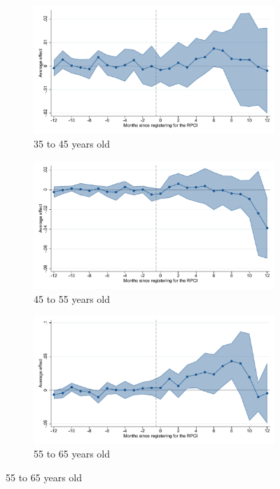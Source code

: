 \begin{figure}[H]
    \begin{subfigure}{0.32\textwidth}
    \caption{35 to 45 years old}
    \includegraphics[width=\textwidth]{04_Figures/muestra_10porciento/event_study_log_sal_cierre_age_35_45_dcdh_connected.pdf}
    \end{subfigure}
    \begin{subfigure}{0.32\textwidth}
    \caption{45 to 55 years old}
    \includegraphics[width=\textwidth]{04_Figures/muestra_10porciento/event_study_log_sal_cierre_age_45_55_dcdh_connected.pdf}
    \end{subfigure}
    \begin{subfigure}{0.32\textwidth}
    \caption{55 to 65 years old}
    \includegraphics[width=\textwidth]{04_Figures/muestra_10porciento/event_study_log_sal_cierre_age_55_65_dcdh_connected.pdf}
    \end{subfigure}


\end{figure}
